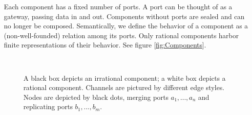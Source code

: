 Each component has a fixed number of ports.
A port can be thought of as a gateway, passing data in and out.
Components without ports are sealed and can no longer be composed.
Semantically, we define the behavior of a component as a (non-well-founded) relation among its ports.
Only rational components harbor finite representations of their behavior.
See figure \ref{fig:Components}.
\begin{figure}[t]
\begin{centering}
$\qquad$$\qquad$
\par\end{centering}
\caption{
	A black box depicts an irrational component;
	a white box depicts a rational component.
	Channels are pictured by different edge styles.
	Nodes are depicted by black dots,
	merging ports $a_1,...,a_n$ and replicating ports $b_1,...,b_m$.}
\end{figure}

